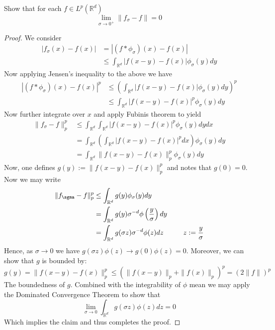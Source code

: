 \documentclass[nocolor]{report}
\begin{document}
\begin{ex}[Question 1b] Show that for each $f\in L^p(\mathbb{R}^d)$ 
$$\lim_{\sigma \rightarrow 0^+}\|f_\sigma - f\|=0$$
\end{ex}
\begin{proof}
    We consider  
    \begin{align*}
        |f_\sigma(x) - f(x)| &= |(f*\phi_\sigma)(x) - f(x)| \\
        &\leq \int_{\mathbb{R}^d} |f(x-y)-f(x)|\phi_\sigma(y)dy
    \end{align*}
    Now applying Jensen's inequality to the above we have 
    \begin{align*}
         |(f*\phi_\sigma)(x) - f(x)|^p &\leq \left( \int_{\mathbb{R}^d} |f(x-y)-f(x)|\phi_\sigma(y)dy \right)^p  \\
         &\leq  \int_{\mathbb{R}^d} |f(x-y)-f(x)|^p\phi_\sigma(y)dy
    \end{align*}
    Now further integrate over $x$ and apply Fubinis theorem to yield 
    \begin{align*}
        \|f_\sigma - f\|_p^p &\leq  \int_{\mathbb{R}^d}\int_{\mathbb{R}^d} |f(x-y)-f(x)|^p\phi_\sigma(y)dydx \\
        &=   \int_{\mathbb{R}^d}\left(\int_{\mathbb{R}^d} |f(x-y)-f(x)|^p dx\right) \phi_\sigma(y)dy \\
        &= \int_{\mathbb{R}^d}\|f(x-y) -f(x)\|_p^p \phi_\sigma(y)dy
    \end{align*}
    Now, one defines $g(y) := \|f(x-y) - f(x)\|^p_p$ and notes that $g(0) = 0$. Now we may write
    \begin{align*}
        \|f_\sgma - f\|^p_p &\leq \int_{\mathbb{R}^d} g(y)\phi_\sigma(y)dy \\
        &= \int_{\mathbb{R}^d} g(y)\sigma^{-d}\phi\left(\frac{y}{\sigma}\right)dy \\
        &= \int_{\mathbb{R}^d} g(\sigma z)\sigma^{-d}\phi(z)dz \hspace{10mm} z:= \frac{y}{\sigma} 
    \end{align*}
    Hence, as $\sigma\rightarrow0$ we have $g(\sigma z)\phi(z) \rightarrow g(0)\phi(z) = 0$. Moreover, we can show that $g$ is bounded by: 
    $$g(y) = \|f(x-y)-f(x)\|^p_p \leq (\|f(x-y)\|_p + \|f(x)\|_p)^p = (2\|f\|)^p$$
    The boundedness of $g$. Combined with the integrability of $\phi$ mean we may apply the Dominated Convergence Theorem to show that 
    $$\lim_{\sigma \rightarrow 0} \int_{\mathbb{R}^d} g(\sigma z)\phi(z)dz = 0$$
    Which implies the claim and thus completes the proof.
\end{proof}
\end{document}
